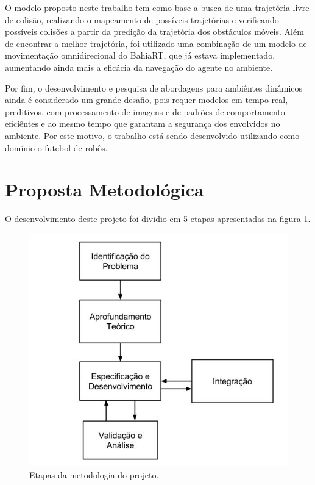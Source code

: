 O modelo proposto neste trabalho tem como base a busca de uma trajetória livre de colisão, realizando o mapeamento de possíveis trajetórias e verificando 
possíveis colisões a partir da predição da trajetória dos obstáculos móveis. Além de encontrar a melhor trajetória, foi utilizado uma 
combinação de um modelo de movimentação omnidirecional do BahiaRT, que já estava implementado, aumentando ainda mais a eficácia da navegação 
do agente no ambiente.
 
Por fim, o desenvolvimento e pesquisa de abordagens para ambiêntes dinâmicos ainda é considerado um grande desafio, pois requer modelos 
em tempo real, preditivos, com processamento de imagens e de padrões de comportamento eficiêntes e ao mesmo tempo que garantam a segurança 
dos envolvidos no ambiente. Por este motivo, o trabalho está sendo desenvolvido utilizando como domínio o futebol de robôs.

\section{Proposta Metodológica}
\label{sec:proposta}
O desenvolvimento deste projeto foi dividio em 5 etapas apresentadas na figura \ref{fig:metodologia}.

\begin{figure}[H]
\centering
\includegraphics[scale=0.4]{figuras/metodologia.jpg}
\caption{Etapas da metodologia do projeto.} 
\label{fig:metodologia}
\end{figure}
\FloatBarrier

